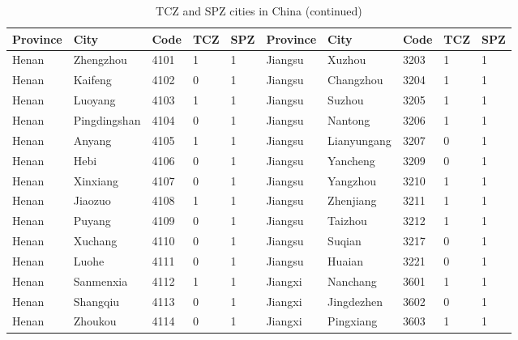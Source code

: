 \documentclass[12pt]{article}
\begin{document}
\begin{table}[!htb] \centering
  \caption{TCZ and SPZ cities in China (continued)}
  \begin{adjustbox}{width=\textwidth, totalheight=\baselineskip,keepaspectratio}
    \label{tab:appendix2}
\begin{tabular}{llllllllll}
\hline
Province       & City         & Code & TCZ & SPZ & Province & City        & Code & TCZ & SPZ \\
\hline
Henan          & Zhengzhou    & 4101           & 1   & 1   & Jiangsu  & Xuzhou      & 3203           & 1   & 1   \\
Henan          & Kaifeng      & 4102           & 0   & 1   & Jiangsu  & Changzhou   & 3204           & 1   & 1   \\
Henan          & Luoyang      & 4103           & 1   & 1   & Jiangsu  & Suzhou      & 3205           & 1   & 1   \\
Henan          & Pingdingshan & 4104           & 0   & 1   & Jiangsu  & Nantong     & 3206           & 1   & 1   \\
Henan          & Anyang       & 4105           & 1   & 1   & Jiangsu  & Lianyungang & 3207           & 0   & 1   \\
Henan          & Hebi         & 4106           & 0   & 1   & Jiangsu  & Yancheng    & 3209           & 0   & 1   \\
Henan          & Xinxiang     & 4107           & 0   & 1   & Jiangsu  & Yangzhou    & 3210           & 1   & 1   \\
Henan          & Jiaozuo      & 4108           & 1   & 1   & Jiangsu  & Zhenjiang   & 3211           & 1   & 1   \\
Henan          & Puyang       & 4109           & 0   & 1   & Jiangsu  & Taizhou     & 3212           & 1   & 1   \\
Henan          & Xuchang      & 4110           & 0   & 1   & Jiangsu  & Suqian      & 3217           & 0   & 1   \\
Henan          & Luohe        & 4111           & 0   & 1   & Jiangsu  & Huaian      & 3221           & 0   & 1   \\
Henan          & Sanmenxia    & 4112           & 1   & 1   & Jiangxi  & Nanchang    & 3601           & 1   & 1   \\
Henan          & Shangqiu     & 4113           & 0   & 1   & Jiangxi  & Jingdezhen  & 3602           & 0   & 1   \\
Henan          & Zhoukou      & 4114           & 0   & 1   & Jiangxi  & Pingxiang   & 3603           & 1   & 1   \\

\end{tabular}
\end{adjustbox}
\end{table}
\end{document}
